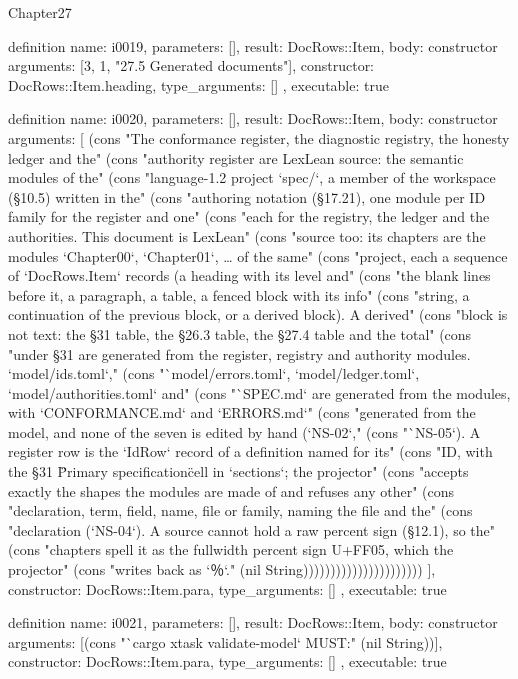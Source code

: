 \begin{lexlean}{Chapter27}
\begin{semanticmodule}
definition{
  name: i0019,
  parameters: [],
  result: DocRows::Item,
  body: constructor{
    arguments: [3, 1, "27.5 Generated documents"],
    constructor: DocRows::Item.heading,
    type_arguments: []
  },
  executable: true
}

definition{
  name: i0020,
  parameters: [],
  result: DocRows::Item,
  body: constructor{
    arguments: [
      (cons "The conformance register, the diagnostic registry, the honesty ledger and the" (cons "authority register are LexLean source: the semantic modules of the" (cons "language-1.2 project `spec/`, a member of the workspace (§10.5) written in the" (cons "authoring notation (§17.21), one module per ID family for the register and one" (cons "each for the registry, the ledger and the authorities. This document is LexLean" (cons "source too: its chapters are the modules `Chapter00`, `Chapter01`, … of the same" (cons "project, each a sequence of `DocRows.Item` records (a heading with its level and" (cons "the blank lines before it, a paragraph, a table, a fenced block with its info" (cons "string, a continuation of the previous block, or a derived block). A derived" (cons "block is not text: the §31 table, the §26.3 table, the §27.4 table and the total" (cons "under §31 are generated from the register, registry and authority modules. `model/ids.toml`," (cons "`model/errors.toml`, `model/ledger.toml`, `model/authorities.toml` and" (cons "`SPEC.md` are generated from the modules, with `CONFORMANCE.md` and `ERRORS.md`" (cons "generated from the model, and none of the seven is edited by hand (`NS-02`," (cons "`NS-05`). A register row is the `IdRow` record of a definition named for its" (cons "ID, with the §31 \"Primary specification\" cell in `sections`; the projector" (cons "accepts exactly the shapes the modules are made of and refuses any other" (cons "declaration, term, field, name, file or family, naming the file and the" (cons "declaration (`NS-04`). A source cannot hold a raw percent sign (§12.1), so the" (cons "chapters spell it as the fullwidth percent sign U+FF05, which the projector" (cons "writes back as `％`." (nil String))))))))))))))))))))))
    ],
    constructor: DocRows::Item.para,
    type_arguments: []
  },
  executable: true
}

definition{
  name: i0021,
  parameters: [],
  result: DocRows::Item,
  body: constructor{
    arguments: [(cons "`cargo xtask validate-model` MUST:" (nil String))],
    constructor: DocRows::Item.para,
    type_arguments: []
  },
  executable: true
}


\end{semanticmodule}
\end{lexlean}
